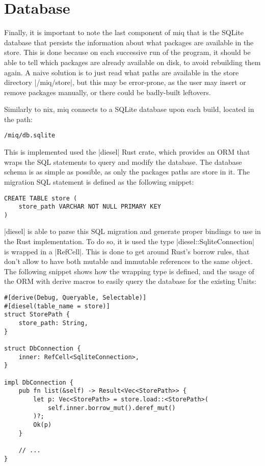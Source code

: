 \FloatBarrier
\section{Database}

Finally, it is important to note the last component of miq
that is the SQLite database that persists the information
about what packages are available in the store. This is done
because on each successive run of the program, it should be
able to tell which packages are already available on disk,
to avoid rebuilding them again. A naive solution is to just
read what paths are available in the store directory
|/miq/store|, but this may be error-prone, as the user may
insert or remove packages manually, or there could be
badly-built leftovers.

Similarly to
nix, miq connects to a SQLite database upon each build,
located in the path:

\begin{verbatim}
/miq/db.sqlite
\end{verbatim}

This is implemented used the |diesel| Rust crate, which
provides an \acl{ORM} that wraps the SQL statements to query
and modify the database. The database schema is as simple as
possible, as only the packages paths are store in it. The
migration SQL statement is defined as the following snippet:

\begin{verbatim}
CREATE TABLE store (
    store_path VARCHAR NOT NULL PRIMARY KEY
)
\end{verbatim}

|diesel| is able to parse this SQL migration and generate
proper bindings to use in the Rust implementation. To do so,
it is used the type |diesel::SqliteConnection| is wrapped in
a |RefCell|. This is done to get around Rust's borrow rules,
that don't allow to have both mutable and immutable
references to the same object. The following snippet shows
how the wrapping type is defined, and the usage of the
\ac{ORM} with derive macros to easily query the database for
the existing Units:

\begin{verbatim}
#[derive(Debug, Queryable, Selectable)]
#[diesel(table_name = store)]
struct StorePath {
    store_path: String,
}

struct DbConnection {
    inner: RefCell<SqliteConnection>,
}

impl DbConnection {
    pub fn list(&self) -> Result<Vec<StorePath>> {
        let p: Vec<StorePath> = store.load::<StorePath>(
            self.inner.borrow_mut().deref_mut()
        )?;
        Ok(p)
    }

    // ...
}
\end{verbatim}

